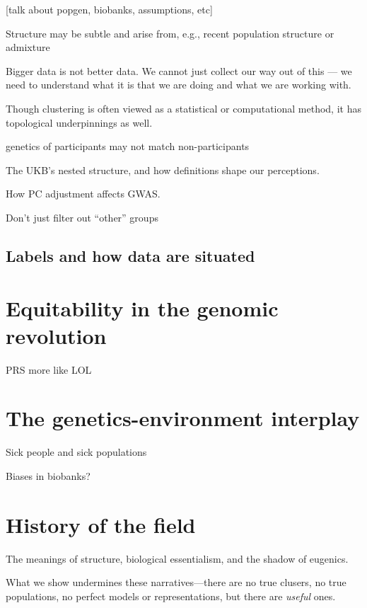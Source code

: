 [talk about popgen, biobanks, assumptions, etc]


Structure may be subtle and arise from, e.g., recent population structure or admixture\citep{gopalan_human_2022}

Bigger data is not better data. We cannot just collect our way out of this --- we need to understand what it is that we are doing and what we are working with.



Though clustering is often viewed as a statistical or computational method, it has topological underpinnings as well.

genetics of participants may not match non-participants
\citep{benonisdottir_studying_2023}

The UKB's nested structure, and how definitions shape our perceptions.

How PC adjustment affects GWAS.

Don't just filter out ``other'' groups

\subsection{Labels and how data are situated}



\section{Equitability in the genomic revolution}



PRS more like LOL\citep{kaplan_polygenic_2022}

\section{The genetics-environment interplay}

Sick people and sick populations\citep{rose_sick_2001}

Biases in biobanks?

\section{History of the field}

The meanings of structure, biological essentialism, and the shadow of eugenics.

What we show undermines these narratives---there are no true clusers, no true populations, no perfect models or representations, but there are \textit{useful} ones.

